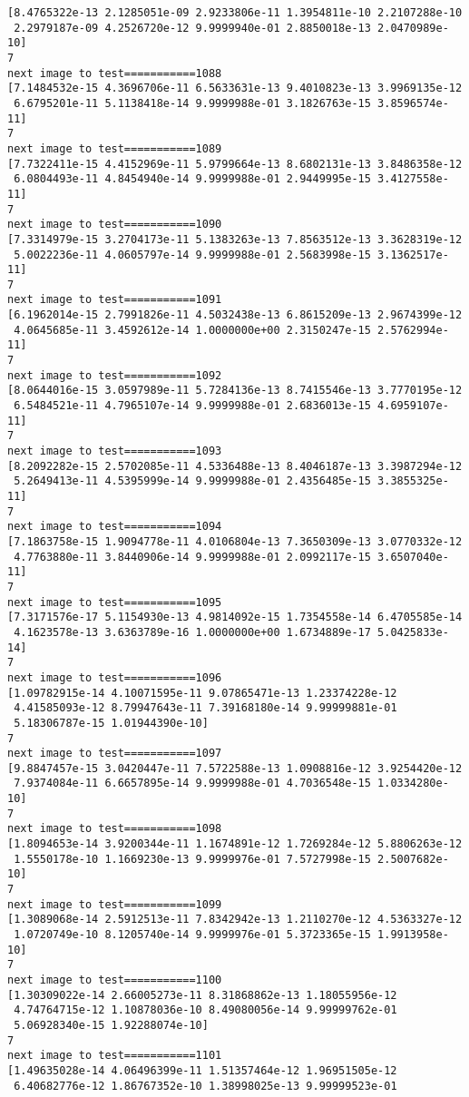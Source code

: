 \documentclass[11pt]{article}
\begin{document}
\begin{Verbatim}[commandchars=\\\{\}]
[8.4765322e-13 2.1285051e-09 2.9233806e-11 1.3954811e-10 2.2107288e-10
 2.2979187e-09 4.2526720e-12 9.9999940e-01 2.8850018e-13 2.0470989e-10]
7
next image to test===========1088
[7.1484532e-15 4.3696706e-11 6.5633631e-13 9.4010823e-13 3.9969135e-12
 6.6795201e-11 5.1138418e-14 9.9999988e-01 3.1826763e-15 3.8596574e-11]
7
next image to test===========1089
[7.7322411e-15 4.4152969e-11 5.9799664e-13 8.6802131e-13 3.8486358e-12
 6.0804493e-11 4.8454940e-14 9.9999988e-01 2.9449995e-15 3.4127558e-11]
7
next image to test===========1090
[7.3314979e-15 3.2704173e-11 5.1383263e-13 7.8563512e-13 3.3628319e-12
 5.0022236e-11 4.0605797e-14 9.9999988e-01 2.5683998e-15 3.1362517e-11]
7
next image to test===========1091
[6.1962014e-15 2.7991826e-11 4.5032438e-13 6.8615209e-13 2.9674399e-12
 4.0645685e-11 3.4592612e-14 1.0000000e+00 2.3150247e-15 2.5762994e-11]
7
next image to test===========1092
[8.0644016e-15 3.0597989e-11 5.7284136e-13 8.7415546e-13 3.7770195e-12
 6.5484521e-11 4.7965107e-14 9.9999988e-01 2.6836013e-15 4.6959107e-11]
7
next image to test===========1093
[8.2092282e-15 2.5702085e-11 4.5336488e-13 8.4046187e-13 3.3987294e-12
 5.2649413e-11 4.5395999e-14 9.9999988e-01 2.4356485e-15 3.3855325e-11]
7
next image to test===========1094
[7.1863758e-15 1.9094778e-11 4.0106804e-13 7.3650309e-13 3.0770332e-12
 4.7763880e-11 3.8440906e-14 9.9999988e-01 2.0992117e-15 3.6507040e-11]
7
next image to test===========1095
[7.3171576e-17 5.1154930e-13 4.9814092e-15 1.7354558e-14 6.4705585e-14
 4.1623578e-13 3.6363789e-16 1.0000000e+00 1.6734889e-17 5.0425833e-14]
7
next image to test===========1096
[1.09782915e-14 4.10071595e-11 9.07865471e-13 1.23374228e-12
 4.41585093e-12 8.79947643e-11 7.39168180e-14 9.99999881e-01
 5.18306787e-15 1.01944390e-10]
7
next image to test===========1097
[9.8847457e-15 3.0420447e-11 7.5722588e-13 1.0908816e-12 3.9254420e-12
 7.9374084e-11 6.6657895e-14 9.9999988e-01 4.7036548e-15 1.0334280e-10]
7
next image to test===========1098
[1.8094653e-14 3.9200344e-11 1.1674891e-12 1.7269284e-12 5.8806263e-12
 1.5550178e-10 1.1669230e-13 9.9999976e-01 7.5727998e-15 2.5007682e-10]
7
next image to test===========1099
[1.3089068e-14 2.5912513e-11 7.8342942e-13 1.2110270e-12 4.5363327e-12
 1.0720749e-10 8.1205740e-14 9.9999976e-01 5.3723365e-15 1.9913958e-10]
7
next image to test===========1100
[1.30309022e-14 2.66005273e-11 8.31868862e-13 1.18055956e-12
 4.74764715e-12 1.10878036e-10 8.49080056e-14 9.99999762e-01
 5.06928340e-15 1.92288074e-10]
7
next image to test===========1101
[1.49635028e-14 4.06496399e-11 1.51357464e-12 1.96951505e-12
 6.40682776e-12 1.86767352e-10 1.38998025e-13 9.99999523e-01

\end{Verbatim}
\end{document}
